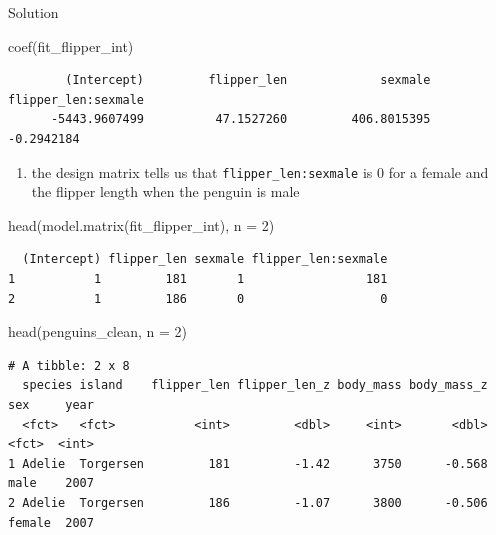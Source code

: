 \documentclass[
  10pt,
  ignorenonframetext,
  aspectratio=169,
  t]{beamer}
\newenvironment{Shaded}{\begin{snugshade}}{\end{snugshade}}
\newcommand{\AttributeTok}[1]{\textcolor[rgb]{0.40,0.45,0.13}{#1}}
\newcommand{\DecValTok}[1]{\textcolor[rgb]{0.68,0.00,0.00}{#1}}
\newcommand{\FunctionTok}[1]{\textcolor[rgb]{0.28,0.35,0.67}{#1}}
\newcommand{\NormalTok}[1]{\textcolor[rgb]{0.00,0.23,0.31}{#1}}
\providecommand{\tightlist}{%
  \setlength{\itemsep}{0pt}\setlength{\parskip}{0pt}}
\let\oldtexttt\texttt
\renewcommand{\texttt}[1]{\colorbox{gray!20}{\oldtexttt{#1}}}
\begin{document}
\begin{frame}[fragile]{Solution}
\protect{}\label{solution-3}
\footnotesize

\begin{Shaded}
\begin{Highlighting}[]
\FunctionTok{coef}\NormalTok{(fit\_flipper\_int)}
\end{Highlighting}
\end{Shaded}

\begin{verbatim}
        (Intercept)         flipper_len             sexmale flipper_len:sexmale 
      -5443.9607499          47.1527260         406.8015395          -0.2942184 
\end{verbatim}

\normalsize

\small

\begin{enumerate}
\tightlist
\item
  the design matrix tells us that \texttt{flipper\_len:sexmale} is 0 for
  a female and the flipper length when the penguin is male
\end{enumerate}

\footnotesize

\begin{Shaded}
\begin{Highlighting}[]
\FunctionTok{head}\NormalTok{(}\FunctionTok{model.matrix}\NormalTok{(fit\_flipper\_int), }\AttributeTok{n =} \DecValTok{2}\NormalTok{)}
\end{Highlighting}
\end{Shaded}

\begin{verbatim}
  (Intercept) flipper_len sexmale flipper_len:sexmale
1           1         181       1                 181
2           1         186       0                   0
\end{verbatim}

\normalsize

\footnotesize

\begin{Shaded}
\begin{Highlighting}[]
\FunctionTok{head}\NormalTok{(penguins\_clean, }\AttributeTok{n =} \DecValTok{2}\NormalTok{)}
\end{Highlighting}
\end{Shaded}

\begin{verbatim}
# A tibble: 2 x 8
  species island    flipper_len flipper_len_z body_mass body_mass_z sex     year
  <fct>   <fct>           <int>         <dbl>     <int>       <dbl> <fct>  <int>
1 Adelie  Torgersen         181         -1.42      3750      -0.568 male    2007
2 Adelie  Torgersen         186         -1.07      3800      -0.506 female  2007
\end{verbatim}

\normalsize
\end{frame}
\end{document}
